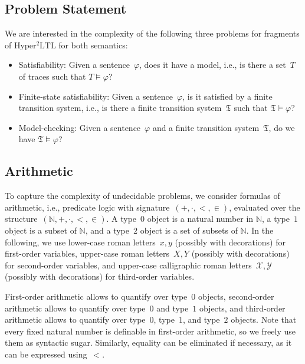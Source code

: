 \documentclass[dvipsnames,10pt,a4paper]{amsart}
\theoremstyle{definition}
\theoremstyle{remark}
\newcommand{\nats}{\mathbb{N}}
\renewcommand{\phi}{\varphi}
\newcommand{\sohyltl}{\mathrm{Hyper^2LTL}\xspace}
\newcommand{\tsys}{\mathfrak{T}}
\newcommand{\natsstruct}{(\nats, +, \cdot, <, \in)}
\begin{document}
\subsection{Problem Statement}

We are interested in the complexity of the following three problems for fragments of $\sohyltl$ for both semantics:
\begin{itemize}
    \item Satisfiability: Given a sentence~$\phi$, does it have a model, i.e., is there a set~$T$ of traces such that $T \models \phi$?
    \item Finite-state satisfiability: Given a sentence~$\phi$, is it satisfied by a finite transition system, i.e., is there a finite transition system~$\tsys$ such that $\tsys \models \phi$?
    \item Model-checking: Given a sentence~$\phi$ and a finite transition system~$\tsys$, do we have $\tsys \models \phi$?
\end{itemize}

\subsection{Arithmetic}
\label{subsec_arithmetic}


To capture the complexity of undecidable problems, we consider formulas of arithmetic, i.e., predicate logic with signature~$(+, \cdot, <, \in)$, evaluated over the structure~$\natsstruct$. 
A type~$0$ object is a natural number in $\nats$, a type~$1$ object is a subset of $\nats$, and a type~$2$ object is a set of subsets of $\nats$.
In the following, we use lower-case roman letters~$x,y$ (possibly with decorations) for first-order variables, upper-case roman letters~$X,Y$ (possibly with decorations) for second-order variables, and upper-case calligraphic roman letters~$\mathcal{X},\mathcal{Y}$ (possibly with decorations) for third-order variables. 

First-order arithmetic allows to quantify over type~$0$ objects, second-order arithmetic allows to quantify over type~$0$ and type~$1$ objects, and third-order arithmetic allows to quantify over type~$0$, type~$1$, and type~$2$ objects.
Note that every fixed natural number is definable in first-order arithmetic, so we freely use them as syntactic sugar. Similarly, equality can be eliminated if necessary, as it can be expressed using~$<$.
\end{document}
